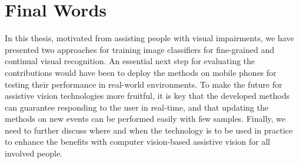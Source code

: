 \section{Final Words}\label{chap5:sec:final_words}

In this thesis, motivated from assisting people with visual impairments, we have presented two approaches for training image classifiers for fine-grained and continual visual recognition. An essential next step for evaluating the contributions would have been to deploy the methods on mobile phones for testing their performance in real-world environments. To make the future for assistive vision technologies more fruitful, it is key that the developed methods can guarantee responding to the user in real-time, and that updating the methods on new events can be performed easily with few samples. Finally, we need to further discuss where and when the technology is to be used in practice to enhance the benefits with computer vision-based assistive vision for all involved people.   













